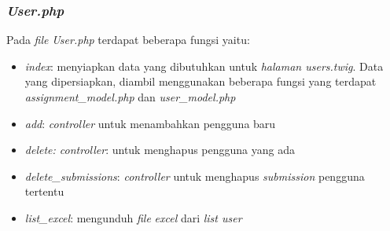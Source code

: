 \subsubsection{\textit{User.php}}
Pada \textit{file} \textit{User.php} terdapat beberapa fungsi yaitu:
\begin{itemize}
	\item \textit{index}: menyiapkan data yang dibutuhkan untuk \textit{halaman users.twig}. Data yang dipersiapkan, diambil menggunakan beberapa fungsi yang terdapat \textit{assignment\_model.php} dan \textit{user\_model.php}
	\item \textit{add}: \textit{controller} untuk menambahkan pengguna baru
	\item \textit{delete: controller}: untuk menghapus pengguna yang ada
	\item \textit{delete\_submissions}: \textit{controller} untuk menghapus \textit{submission} pengguna tertentu
	\item \textit{list\_excel}: mengunduh \textit{file} \textit{excel} dari \textit{list user}
\end{itemize}